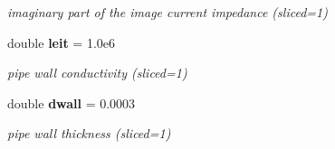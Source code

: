 \begin{CompactItemize}
\begin{CompactList}\small\item\em imaginary part of the image current impedance (sliced=1)\item\end{CompactList}\item 
double {\bf leit} = 1.0e6\label{group__Impedance_a6}

\begin{CompactList}\small\item\em pipe wall conductivity (sliced=1)\item\end{CompactList}\item 
double {\bf dwall} = 0.0003\label{group__Impedance_a7}

\begin{CompactList}\small\item\em pipe wall thickness (sliced=1)\item\end{CompactList}\end{CompactItemize}
